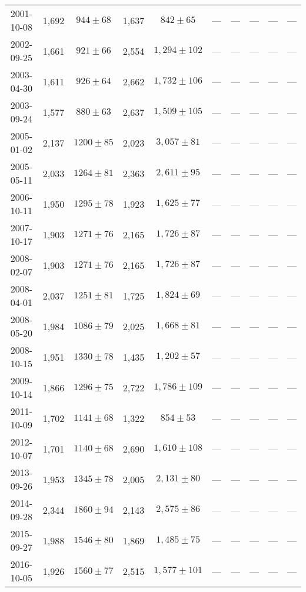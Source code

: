 \begin{landscape}
\begin{longtable}{cccccccccc}
{2001-10-08} & 1,692 & {$944  \pm  68$} & 1,637 & {$842 \pm 65$} & --- & --- & --- & --- & --- \\
{2002-09-25} & 1,661 & {$921  \pm  66$} & 2,554 & {$1,294 \pm 102$} & --- & --- & --- & --- & --- \\
{2003-04-30} & 1,611 & {$926  \pm  64$} & 2,662 & {$1,732 \pm 106$} & --- & --- & --- & --- & --- \\
{2003-09-24} & 1,577 & {$880  \pm  63$} & 2,637 & {$1,509 \pm 105$} & --- & --- & --- & --- & --- \\
{2005-01-02} & 2,137 & {$1200  \pm  85$} & 2,023 & {$3,057 \pm 81$} & --- & --- & --- & --- & --- \\
{2005-05-11} & 2,033 & {$1264  \pm  81$} & 2,363 & {$2,611 \pm 95$} & --- & --- & --- & --- & --- \\
{2006-10-11} & 1,950 & {$1295  \pm  78$} & 1,923 & {$1,625 \pm 77$} & --- & --- & --- & --- & --- \\
{2007-10-17} & 1,903 & {$1271  \pm  76$} & 2,165 & {$1,726 \pm 87$} & --- & --- & --- & --- & --- \\
{2008-02-07} & 1,903 & {$1271  \pm  76$} & 2,165 & {$1,726 \pm 87$} & --- & --- & --- & --- & --- \\
{2008-04-01} & 2,037 & {$1251  \pm  81$} & 1,725 & {$1,824 \pm 69$} & --- & --- & --- & --- & --- \\
{2008-05-20} & 1,984 & {$1086  \pm  79$} & 2,025 & {$1,668 \pm 81$} & --- & --- & --- & --- & --- \\
{2008-10-15} & 1,951 & {$1330  \pm  78$} & 1,435 & {$1,202 \pm 57$} & --- & --- & --- & --- & --- \\
{2009-10-14} & 1,866 & {$1296  \pm  75$} & 2,722 & {$1,786 \pm 109$} & --- & --- & --- & --- & --- \\
{2011-10-09} & 1,702 & {$1141  \pm  68$} & 1,322 & {$854 \pm 53$} & --- & --- & --- & --- & --- \\
{2012-10-07} & 1,701 & {$1140  \pm  68$} & 2,690 & {$1,610 \pm 108$} & --- & --- & --- & --- & --- \\
{2013-09-26} & 1,953 & {$1345  \pm  78$} & 2,005 & {$2,131 \pm 80$} & --- & --- & --- & --- & --- \\
{2014-09-28} & 2,344 & {$1860  \pm  94$} & 2,143 & {$2,575 \pm 86$} & --- & --- & --- & --- & --- \\
{2015-09-27} & 1,988 & {$1546  \pm  80$} & 1,869 & {$1,485 \pm 75$} & --- & --- & --- & --- & --- \\
{2016-10-05} & 1,926 & {$1560  \pm  77$} & 2,515 & {$1,577 \pm 101$} & --- & --- & --- & --- & --- \\
\end{longtable} 
\end{landscape} 
